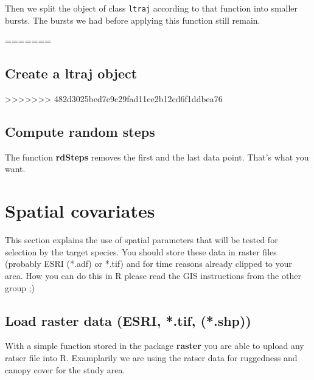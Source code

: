 \documentclass[11pt, a4paper]{article} %
\begin{document}
Then we split the object of class \texttt{ltraj} according to that function into smaller bursts. The bursts we had before applying this function still remain.

\begin{knitrout}
\color{fgcolor}\begin{kframe}
\begin{alltt}
 \hlkwb{<-}  \hlstd{,}  \hlstd{=} \hlstd{)}
\end{alltt}
\end{kframe}
\end{knitrout}

=======
\subsection{Create a ltraj object}%
 
>>>>>>> 482d3025bed7e9c29fad11ee2b12cd6f1ddbea76

\subsection{Compute random steps}

The function \textbf{rdSteps} removes the first and the last data point. That's what you want. 

\section{Spatial covariates}%
This section explains the use of spatial parameters that will be tested for selection by the target species. You should store these data in raster files (probably ESRI (*.adf) or *.tif) and for time reasons already clipped to your area. How you can do this in R please read the GIS instructions from the other group ;)   

\subsection{Load raster data (ESRI, *.tif, (*.shp))}%
With a simple function stored in the package \textbf{raster} you are able to upload any ratser file into R. Examplarily we are using the ratser data for ruggedness and canopy cover for the study area.  
\end{document}
